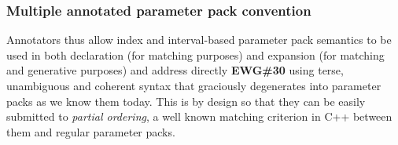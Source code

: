 \subsubsection{Multiple annotated parameter pack convention}


\p Annotators thus allow index and interval-based parameter pack semantics to be used in both declaration (for matching purposes) and expansion (for matching and generative purposes) and address directly \textbf{EWG\#30} \cite{Abrahams2012} using terse, unambiguous and coherent syntax that graciously degenerates into parameter packs as we know them today.
This is by design so that they can be easily submitted to \textit{partial ordering}, a well known matching criterion in C++ between them and regular parameter packs.
        
